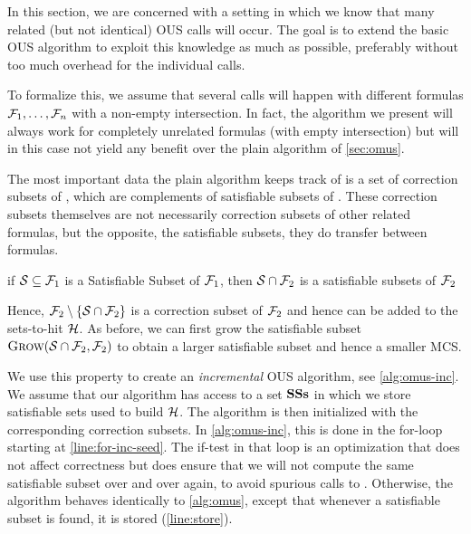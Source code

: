 In this section, we are concerned with a setting in which we know that many related (but not identical) OUS calls will occur. The goal is to extend the basic OUS algorithm to exploit this knowledge as much as possible, preferably without too much overhead for the individual calls. 

\newcommand\satsets{\mm{\mathbf{SSs}}}
\newcommand\fall{\mm{\formula_{\mathit{all}}}}
To formalize this, we assume that several \omus calls will happen with different formulas $\mathcal{F} _1,\dots,\mathcal{F} _n$ with a non-empty intersection. In fact, the algorithm we present will always work for completely unrelated formulas (with empty intersection) but will in this case not yield any benefit over the plain \omus algorithm of \cref{sec:omus}. 

The most important data the plain \omus algorithm keeps track of is a set of correction subsets of \formula, which are complements of satisfiable subsets of \formula.
These correction subsets themselves are not necessarily correction subsets of other related formulas, but the opposite, the satisfiable subsets, they do transfer between formulas.

\begin{proposition}\label{prop:ss}
if $\mathcal{S} \subseteq \mathcal{F} _1$ is a Satisfiable Subset of $\mathcal{F} _1$, then $\mathcal{S}\cap \mathcal{F} _2$ is a satisfiable subsets of $\mathcal{F} _2$
\end{proposition}
Hence, $\mathcal{F} _2 \setminus \{\mathcal{S}\cap \mathcal{F} _2\}$ is a correction subset of $\mathcal{F} _2$ and hence can be added to the sets-to-hit $\mathcal{H} $. As before, we can first grow the satisfiable subset $\textsc{Grow}(\mathcal{S}\cap \mathcal{F} _2,\mathcal{F} _2)$ to obtain a larger satisfiable subset and hence a smaller MCS.

We use this property to create an \textit{incremental} OUS algorithm, see \cref{alg:omus-inc}. We assume that our algorithm has access to a set $\satsets$ in which we store satisfiable sets used to build $\mathcal{H} $. The \omus algorithm is then initialized with the corresponding correction subsets. 
In  \cref{alg:omus-inc}, this is done in the for-loop starting at \cref{line:for-inc-seed}. The if-test in that loop is an optimization that does not affect correctness but does ensure that we will not compute the same satisfiable subset over and over again, to avoid spurious calls to \grow. 
Otherwise, the algorithm behaves identically to \cref{alg:omus}, except that whenever a satisfiable subset is found, it is stored (\cref{line:store}). 
 


